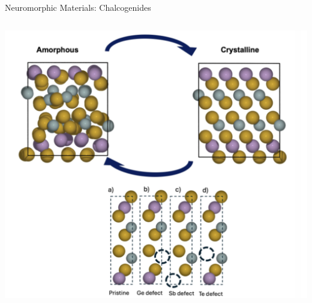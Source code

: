 \documentclass[aspectratio=169]{beamer}
\begin{document}
\begin{frame}{Neuromorphic Materials: Chalcogenides}
\begin{columns}
\begin{column}{0.4\textwidth}
      \includegraphics[height=0.4\textheight]{media/gst_phases.png}
    \end{column}
  \end{columns}
\end{frame}
\end{document}
